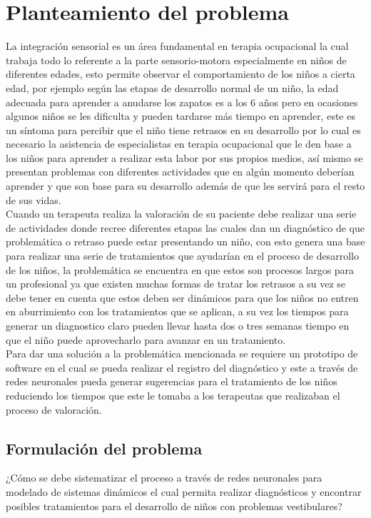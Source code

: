 \section{Planteamiento del problema}
	La  integración  sensorial  es  un  área  fundamental  en  terapia  ocupacional  la cual trabaja  todo  lo  referente  a  la  parte  sensorio-motora  especialmente  en  niños  de diferentes edades,  esto  permite  observar  el  comportamiento de  los  niños  a  cierta edad,  por  ejemplo  según  las  etapas  de  desarrollo  normal  de  un  niño,  la  edad adecuada para aprender a anudarse los zapatos es a los 6 años pero en ocasiones algunos niños se les dificulta y pueden tardarse más tiempo en aprender, este es un síntoma para percibir que el niño tiene retrasos en su desarrollo por lo cual es necesario la asistencia de especialistas en terapia ocupacional que le den base a los niños para aprender a realizar esta labor por sus propios medios, así mismo se presentan  problemas  con  diferentes  actividades  que  en  algún  momento  deberían aprender y que son base para su desarrollo además de que les servirá para el resto de sus vidas.\\
	Cuando un terapeuta realiza la valoración de su paciente debe realizar una serie de actividades  donde  recree  diferentes  etapas  las  cuales dan  un  diagnóstico  de  que problemática o retraso puede estar presentando un niño, con esto genera una base para realizar una serie de tratamientos que ayudarían en el proceso de desarrollo de los niños, la problemática se encuentra en que estos son procesos largos para un profesional ya que existen muchas formas de tratar los retrasos a su vez se debe tener  en  cuenta  que  estos  deben  ser  dinámicos  para  que  los  niños  no  entren  en aburrimiento con los tratamientos que se aplican, a su vez los tiempos para generar un diagnostico claro pueden llevar hasta dos o tres semanas tiempo en que el niño puede aprovecharlo para avanzar en un tratamiento.\\
	Para  dar  una  solución  a  la  problemática  mencionada  se  requiere  un  prototipo  de software en el cual se pueda realizar el registro del diagnóstico y este a través de redes  neuronales pueda  generar  sugerencias  para  el  tratamiento  de  los  niños reduciendo  los  tiempos  que  este  le  tomaba  a  los  terapeutas  que  realizaban  el proceso de valoración.
	\subsection{Formulación del problema}
		¿Cómo  se  debe  sistematizar  el  proceso  a  través  de redes  neuronales  para modelado de sistemas dinámicos el cual permita realizar diagnósticos y encontrar posibles tratamientos para el desarrollo de niños con problemas vestibulares?\\
